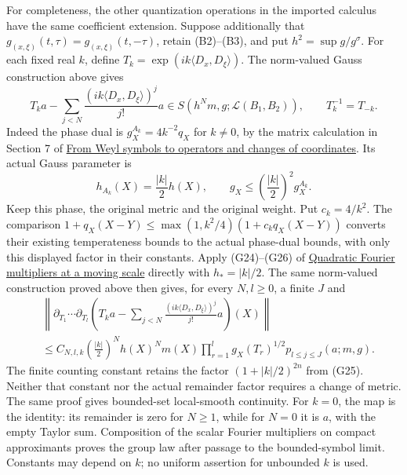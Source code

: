 \documentclass[
  11pt,
]{article}
\begin{document}
For completeness, the other quantization operations in the imported
calculus have the same coefficient extension. Suppose additionally that
\(g_{(x,\xi)}(t,\tau)=g_{(x,\xi)}(t,-\tau)\), retain (B2)--(B3), and put
\(h^2=\sup g/g^\sigma\). For each fixed real \(k\), define
\(T_k=\exp(ik\langle D_x,D_\xi\rangle)\). The norm-valued Gauss
construction above gives \[
 T_ka-\sum_{j<N}\frac{(ik\langle D_x,D_\xi\rangle)^j}{j!}a
 \in S(h^Nm,g;\mathcal L(B_1,B_2)),\qquad T_k^{-1}=T_{-k}.
 \tag{B8a}
\] Indeed the phase dual is \(g^{A_k}_X=4k^{-2}q_X\) for \(k\ne0\), by
the matrix calculation in Section 7 of
\href{weyl-covariance-action.pdf}{From Weyl symbols to operators and
changes of coordinates}. Its actual Gauss parameter is \[
 h_{A_k}(X)=\frac{|k|}{2}h(X),\qquad
 g_X\le\left(\frac{|k|}{2}\right)^2g^{A_k}_X.
 \tag{B8c}
\] Keep this phase, the original metric and the original weight. Put
\(c_k=4/k^2\). The comparison
\(1+q_X(X-Y)\le\max(1,k^2/4)(1+c_kq_X(X-Y))\) converts their existing
temperateness bounds to the actual phase-dual bounds, with only this
displayed factor in their constants. Apply (G24)--(G26) of
\href{gauss-transform-estimates.pdf}{Quadratic Fourier multipliers at a
moving scale} directly with \(h_*=|k|/2\). The same norm-valued
construction proved above then gives, for every \(N,l\ge0\), a finite
\(J\) and \[
 \begin{aligned}
 & \left\|\partial_{T_1}\cdots\partial_{T_l}
 \left(T_ka-\sum_{j<N}\frac{(ik\langle D_x,D_\xi\rangle)^j}{j!}a\right)(X)\right\|
 \\ &\le C_{N,l,k}\left(\frac{|k|}{2}\right)^N h(X)^N m(X)
       \prod_{r=1}^l g_X(T_r)^{1/2}
       p_{l\le j\le J}(a;m,g).
 \end{aligned}
 \tag{B8d}
\] The finite counting constant retains the factor \((1+|k|/2)^{2n}\)
from (G25). Neither that constant nor the actual remainder factor
requires a change of metric. The same proof gives bounded-set
local-smooth continuity. For \(k=0\), the map is the identity: its
remainder is zero for \(N\ge1\), while for \(N=0\) it is \(a\), with the
empty Taylor sum. Composition of the scalar Fourier multipliers on
compact approximants proves the group law after passage to the
bounded-symbol limit. Constants may depend on \(k\); no uniform
assertion for unbounded \(k\) is used.
\end{document}
